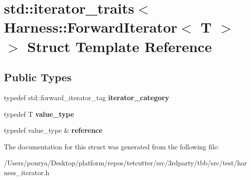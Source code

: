 \hypertarget{structstd_1_1iterator__traits_3_01Harness_1_1ForwardIterator_3_01T_01_4_01_4}{}\section{std\+:\+:iterator\+\_\+traits$<$ Harness\+:\+:Forward\+Iterator$<$ T $>$ $>$ Struct Template Reference}
\label{structstd_1_1iterator__traits_3_01Harness_1_1ForwardIterator_3_01T_01_4_01_4}
\subsection*{Public Types}
\begin{DoxyCompactItemize}
\item 
\hypertarget{structstd_1_1iterator__traits_3_01Harness_1_1ForwardIterator_3_01T_01_4_01_4_a86c2392597500d04ed13dfa0b2c2f0a5}{}typedef std\+::forward\+\_\+iterator\+\_\+tag {\bfseries iterator\+\_\+category}\label{structstd_1_1iterator__traits_3_01Harness_1_1ForwardIterator_3_01T_01_4_01_4_a86c2392597500d04ed13dfa0b2c2f0a5}

\item 
\hypertarget{structstd_1_1iterator__traits_3_01Harness_1_1ForwardIterator_3_01T_01_4_01_4_a4422726dc3e7324c1552df4697ffe06a}{}typedef T {\bfseries value\+\_\+type}\label{structstd_1_1iterator__traits_3_01Harness_1_1ForwardIterator_3_01T_01_4_01_4_a4422726dc3e7324c1552df4697ffe06a}

\item 
\hypertarget{structstd_1_1iterator__traits_3_01Harness_1_1ForwardIterator_3_01T_01_4_01_4_abbfbf894692d4fe04caf5fbc48db7049}{}typedef value\+\_\+type \& {\bfseries reference}\label{structstd_1_1iterator__traits_3_01Harness_1_1ForwardIterator_3_01T_01_4_01_4_abbfbf894692d4fe04caf5fbc48db7049}

\end{DoxyCompactItemize}


The documentation for this struct was generated from the following file\+:\begin{DoxyCompactItemize}
\item 
/\+Users/pourya/\+Desktop/platform/repos/tetcutter/src/3rdparty/tbb/src/test/harness\+\_\+iterator.\+h\end{DoxyCompactItemize}
